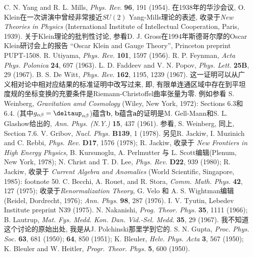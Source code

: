 \begin{thebibliography}{99}
C. N. Yang and R. L. Mills, {\textit{Phys. Rev.}} {\bf{96}}, 191 (1954). 在1938年的华沙会议, O. Klein在一次讲演中曾经非常接近$SU(2)$ Yang-Mills理论的表述, 收录于{\textit{New Theories in Physics}} (International Institute of Intellectual Cooperation, Paris, 1939). 关于Klein理论的批判性讨论, 参看D. J. Gross在1994年斯德哥尔摩的Oscar Klein研讨会上的报告 ``Oscar Klein and Gauge Theory'', Princeton preprint PUPT-1508.
R. Utiyama, {\textit{Phys. Rev.}} {\bf{101}}, 1597 (1956).
R. P. Feynman, {\textit{Acta Phys. Polonica}} {\bf{24}}, 697 (1963).
L. D. Faddeev and V. N. Popov, {\textit{Phys. Lett.}} {\bf{25B}}, 29 (1967).
B. S. De Witt, {\textit{Phys. Rev.}} {\bf{162}}, 1195, 1239 (1967).
这一证明可以从广义相对论中相对应结果的标准证明中改写过来, 即, 有限单连通区域中存在到平坦度规的坐标变换的充要条件是Riemann-Christoffel曲率张量为零. 例如参看 S. Weinberg, {\textit{Gravitation amd Cosmology}} (Wiley, New York, 1972): Sections 6.3和6.4.
 (其中$g_{\alpha \beta}=\deltaup _{\alpha \beta}$)蕴含{\bf{b}}, {\bf{b}}蕴含{\bf{a}}的证明是M. Gell-Mann和S. L. Glashow给出的, {\textit{Ann. Phys. (N.Y.)}} {\bf{15}}, 437 (1961).
参看, S. Weinberg, 同上, Section 7.6.
V. Gribov, {\textit{Nucl. Phys.}} {\bf{B139}}, 1 (1978). 另见R. Jackiw, I. Muzinich and C. Rebbi, {\textit{Phys. Rev.}} {\bf{D17}}, 1576 (1978); R. Jackiw, 收录于 {\textit{New Frontiers in High Energy Physics}}, B. Kursunoglu, A. Perlmutter 与 L. Scott编辑(Plenum, New York, 1978); N. Christ and T. D. Lee, {\textit{Phys. Rev.}} {\bf{D22}}, 939 (1980); R. Jackiw, 收录于 {\textit{Current Algebra and Anomalies}} (World Scientific, Singapore, 1985): footnote 50.
C. Becchi, A. Rouet, and R. Stora, {\textit{Comm. Math. Phys.}} {\bf{42}}, 127 (1975); 收录于{\textit{Renormalization Theory}}, G. Velo 和 A. S. Wightman编辑(Reidel, Dordrecht, 1976); {\textit{Ann. Phys.}} {\bf{98}}, 287 (1976).
I. V. Tyutin, Lebedev Institute preprint N39 (1975).
N. Nakanishi, {\textit{Prog. Theor. Phys.}} {\bf{35}}, 1111 (1966); B. Lautrup, {\textit{Mat. Fys. Medd. Kon. Dan. Vid.-Sel. Medd.}} {\bf{35}}, 29 (1967).
我不知道这个讨论的原始出处, 我是从J. Polchinski那里学到它的.
S. N. Gupta, {\textit{Proc. Phys. Soc.}} {\bf{63}}, 681 (1950); {\bf{64}}, 850 (1951); K. Bleuler, {\textit{Helv. Phys. Acta}} {\bf{3}}, 567 (1950); K. Bleuler and W. Heitler, {\textit{Progr. Theor. Phys.}} {\bf{5}}, 600 (1950).

\end{thebibliography}
